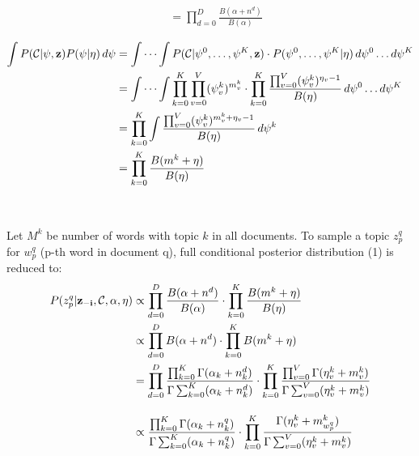 \documentclass[11pt]{article}
\begin{document}
\begin{spacing}{1.6}
\begin{equation}
\begin{split}
                 & = \prod_{d=0}^{D} \frac{B(\alpha+n^d)}{B(\alpha)}\\
\                
\end{split}
\end{equation}
\begin{equation} \label{eq2}
\begin{split}
\int P(\mathcal{C}|\psi,{\bf{z}}) P({\psi}|\eta)\, d\psi 
                             & = \idotsint P(\mathcal{C}|\psi^0,\ldots,\psi^K,{\bf{z}}) \cdot P(\psi^0,\ldots,\psi^K | \eta) \,d\psi^0 \ldots d\psi^K\\
                             & = \idotsint \prod_{k=0}^{K}\prod_{v=0}^{V} ({\psi^k_v})^{m^k_v} \cdot \prod_{k=0}^{K}\frac{\prod_{v=0}^{V} ({\psi^k_v})^{\eta_v-1}}{B(\eta)} \,d\psi^0 \ldots d\psi^K\\
                             & =  \prod_{k=0}^{K} \int \frac{\prod_{v=0}^{V} ({\psi^k_v})^{{m^k_v}+\eta_v-1}}{B(\eta)} \,d\psi^k \\
                             & = \prod_{k=0}^{K} \frac{B(m^k+\eta)}{B(\eta)}\\
\                
\end{split}
\end{equation}\\
\noindent Let $M^k$ be number of words with topic $k$ in all documents. To sample a topic $z^q_p$ for $w^q_p$ (p-th word in document q), full conditional posterior distribution (1) is reduced to:
\begin{equation} \label{eq2}
\begin{split}
P({z^q_p}| {\bf{z}_{-i}},\mathcal{C},\alpha,\eta) & \propto\prod_{d=0}^{D} \frac{B(\alpha+n^d)}{B(\alpha)} \cdot \prod_{k=0}^{K} \frac{B(m^k+\eta)}{B(\eta)}\\
& \propto \prod_{d=0}^{D} B(\alpha+n^d) \cdot \prod_{k=0}^{K} B(m^k+\eta)\\
& = \prod_{d=0}^{D} \frac{\prod_{k=0}^{K} \Gamma (\alpha_k+n^d_k) }{\Gamma \sum_{k=0}^{K} (\alpha_k + n^d_k)} \cdot \prod_{k=0}^{K} \frac{\prod_{v=0}^{V} \Gamma (\eta^k_v+m^k_v) }{\Gamma \sum_{v=0}^{V} (\eta^k_v + m^k_v)}\\[10pt]
& \propto \frac{\prod_{k=0}^{K} \Gamma (\alpha_k+n^q_k) }{\Gamma \sum_{k=0}^{K} (\alpha_k + n^q_k)} \cdot \prod_{k=0}^{K}\frac{ \Gamma (\eta^k_v+m^k_{w^q_p}) }{\Gamma \sum_{v=0}^{V} (\eta^k_v + m^k_v)}\\[15pt]
\   
\end{split}
\end{equation}
\begin{equation} \label{eq2}

\end{equation}
\end{spacing}
\end{document}
